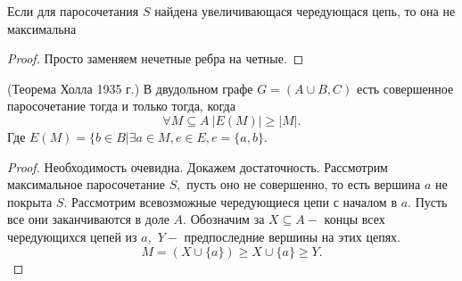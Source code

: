 \begin{lemma}
    Если для паросочетания $S$ найдена увеличивающася  чередующася цепь, то она не максимальна
\end{lemma}
\begin{proof}
    Просто заменяем нечетные ребра на четные.
\end{proof}

\begin{theorem}
    (Теорема Холла 1935 г.) В двудольном графе $G = (A \cup B, C)$ есть совершенное паросочетание тогда и только тогда, когда 
    $$\forall M \subseteq A \ |E(M)| \geq |M|.$$
    Где $E(M) = \{ b \in B| \exists a \in M, e \in E, e = \{a, b\}.$
\end{theorem}

\begin{proof}
    Необходимость очевидна. Докажем достаточность. Рассмотрим максимальное паросочетание $S,$ пусть оно не совершенно, то есть вершина $a$ не покрыта $S.$ Рассмотрим всевозможные чередующиеся цепи с началом в $a.$ Пусть все они заканчиваются в доле $A.$ Обозначим за $X \subseteq A- $ концы всех чередующихся цепей из $a,$ $Y -$ предпоследние вершины на этих цепях. 
    $$M = (X \cup \{ a \} ) \geq X \cup \{ a \}  \geq Y.$$
\end{proof}

